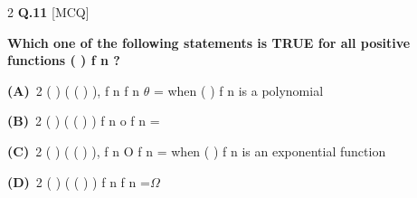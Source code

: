 \documentclass[a4paper,10pt,twoside]{article}
\begin{document}
\begin{multicols}{2}
\noindent\textbf{Q.11} \hfill {\footnotesize\textsf{[MCQ]}}
\par\vspace{2pt}
{\bfseries Which one of the following statements is TRUE for all positive functions
( )
f n ? \par}
\par\vspace{2pt}\noindent
\textbf{(A)}~2  \newline ( \newline ) \newline ( ( ) ), \newline f n \newline f n \newline $\theta$ \newline = \newline when \newline ( ) \newline f n is a polynomial\par\vspace{2pt}\noindent
\textbf{(B)}~2  \newline ( \newline ) \newline ( ( ) ) \newline f n \newline o f n \newline =\par\vspace{2pt}\noindent
\textbf{(C)}~2  \newline ( \newline ) \newline ( ( ) ), \newline f n \newline O f n \newline = \newline when \newline ( ) \newline f n is an exponential function\par\vspace{2pt}\noindent
\textbf{(D)}~2  \newline ( \newline ) \newline ( ( ) ) \newline f n \newline f n \newline =$\Omega$

\end{multicols}
\end{document}
